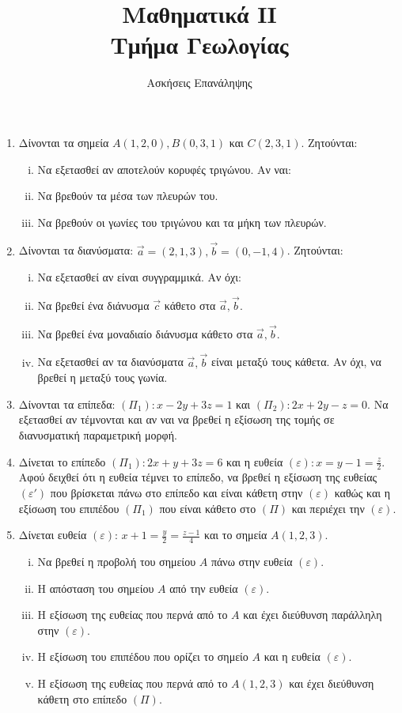 \documentclass[a4paper,12pt]{article}
\title{\textbf{Μαθηματικά ΙΙ} \\ Τμήμα Γεωλογίας}
\author{Ασκήσεις Επανάληψης}
\begin{document}
\maketitle


\begin{enumerate}

\item Δίνονται τα σημεία $Α(1,2,0), Β(0,3,1)$ και $C(2,3,1)$. Ζητούνται:
\begin{enumerate}[i)]
\item Να εξετασθεί αν αποτελούν κορυφές τριγώνου. Αν ναι:
\item Να βρεθούν τα μέσα των πλευρών του. 
\item Να βρεθούν οι γωνίες του τριγώνου και τα μήκη των πλευρών.
\end{enumerate}

\item Δίνονται τα διανύσματα: $\vec{a}=(2,1,3), \vec{b}=(0,-1,4)$. Ζητούνται:
\begin{enumerate}[i)]
\item Να εξετασθεί αν είναι συγγραμμικά. Αν όχι:
\item Να βρεθεί ένα διάνυσμα $\vec{c}$ κάθετο στα $\vec{a}, \vec{b}$.
\item Να βρεθεί ένα μοναδιαίο διάνυσμα κάθετο στα $\vec{a}, \vec{b}$.
\item Να εξετασθεί αν τα διανύσματα $\vec{a}, \vec{b}$ είναι μεταξύ τους κάθετα. Αν όχι, να βρεθεί η μεταξύ τους γωνία.
\end{enumerate}

\item Δίνονται τα επίπεδα: $(\Pi_1): x-2y+3z=1$ και $(\Pi_2): 2x+2y-z=0$. Να εξετασθεί αν τέμνονται και αν ναι να βρεθεί η εξίσωση της τομής σε διανυσματική παραμετρική μορφή.

\item Δίνεται το επίπεδο $(\Pi_1): 2x+y+3z=6$ και η ευθεία $(\varepsilon): x=y-1=\frac{z}{2}$. Αφού δειχθεί ότι η ευθεία τέμνει το επίπεδο, να βρεθεί η εξίσωση της ευθείας $(\varepsilon')$ που βρίσκεται πάνω στο επίπεδο και είναι κάθετη στην $(\varepsilon)$ καθώς και η εξίσωση του επιπέδου $(\Pi_1)$ που είναι κάθετο στο $(\Pi)$ και περιέχει την $(\varepsilon)$.

\item Δίνεται ευθεία $(\varepsilon)$: $x+1=\frac{y}{2}=\frac{z-1}{4}$ και το σημεία $A(1,2,3)$.
\begin{enumerate}[i)]
\item Να βρεθεί η προβολή του σημείου $A$ πάνω στην ευθεία $(\varepsilon)$.
\item Η απόσταση του σημείου $A$ από την ευθεία $(\varepsilon)$.
\item Η εξίσωση της ευθείας που περνά από το $A$ και έχει διεύθυνση παράλληλη στην $(\varepsilon)$.
\item Η εξίσωση του επιπέδου που ορίζει το σημείο $A$ και η ευθεία $(\varepsilon)$.
\item Η εξίσωση της ευθείας που περνά από το $A(1,2,3)$ και έχει διεύθυνση κάθετη στο επίπεδο $(\Pi)$.
\end{enumerate}


\end{enumerate}
\end{document}
